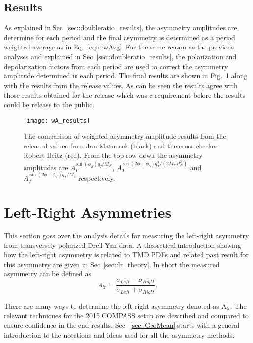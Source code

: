 \subsection{Results}
As explained in Sec~\ref{sec::doubleratio_results}, the asymmetry amplitudes are
determine for each period and the final asymmetry is determined as a period
weighted average as in Eq.~\ref{equ::wAvg}.  For the same reason as the previous
analyses and explained in Sec~\ref{sec::doubleratio_results}, the polarization
and depolarization factors from each period are used to correct the asymmetry
amplitude determined in each period.  The final results are shown in
Fig.~\ref{fig::wA_results} along with the results from the release values.  As
can be seen the results agree with those results obtained for the release which
was a requirement before the results could be release to the public.

\begin{figure}[h!t]
  \centering \texttt{[image: wA\_results]}
  \caption{The comparison of weighted asymmetry amplitude results from the
    released values from Jan Matousek (black) and the cross checker Robert Heitz
    (red).  From the top row down the asymmetry amplitudes are
    $A_T^{\sin(\phi_S) q_T/M_N}$, $A_T^{\sin(2\phi+\phi_S)
      q^3_T/(2M_{\pi}M_N^2)}$ and $A_T^{\sin(2\phi-\phi_S) q_T/M_{\pi}}$
    respectively.}
  \label{fig::wA_results}
\end{figure}


\section{Left-Right Asymmetries} \label{sec::leftrightasym}

This section goes over the analysis details for measuring the left-right
asymmetry from transversely polarized Drell-Yan data.  A theoretical
introduction showing how the left-right asymmetry is related to TMD PDFs and
related past result for this asymmetry are given in Sec~\ref{sec::lr_theory}.
In short the measured asymmetry can be defined as
\begin{equation}
  A_{lr} = \frac{\sigma_{Left} - \sigma_{Right}}{\sigma_{Left} +
    \sigma_{Right}}.
\end{equation}

There are many ways to determine the left-right asymmetry denoted as
A$_{\mathrm{N}}$.  The relevant techniques for the 2015 COMPASS setup are
described and compared to ensure confidence in the end results.
Sec.~\ref{sec::GeoMean} starts with a general introduction to the notations and
ideas used for all the asymmetry methods.

